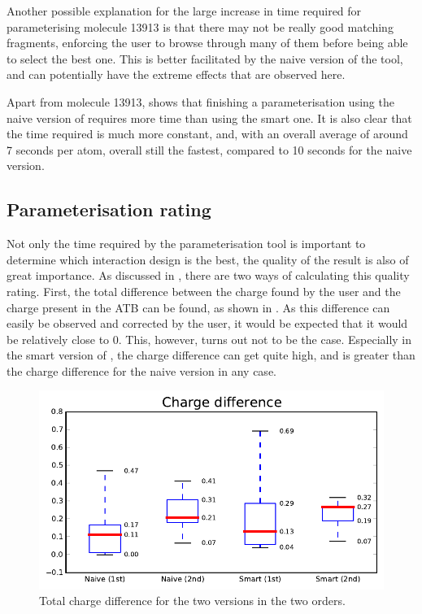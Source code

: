 Another possible explanation for the large increase in time required for parameterising molecule 13913 is that there may not be really good matching fragments, enforcing the user to browse through many of them before being able to select the best one. This is better facilitated by the naive version of the tool, and can potentially have the extreme effects that are observed here.

Apart from molecule 13913,  shows that finishing a parameterisation using the naive version of \oframp{} requires more time than using the smart one. It is also clear that the time required is much more constant, and, with an overall average of around 7 seconds per atom, overall still the fastest, compared to 10 seconds for the naive version.


\subsection{Parameterisation rating}
Not only the time required by the parameterisation tool is important to determine which interaction design is the best, the quality of the result is also of great importance. As discussed in , there are two ways of calculating this quality rating. First, the total difference between the charge found by the user and the charge present in the ATB can be found, as shown in . As this difference can easily be observed and corrected by the user, it would be expected that it would be relatively close to 0. This, however, turns out not to be the case. Especially in the smart version of \oframp, the charge difference can get quite high, and is greater than the charge difference for the naive version in any case.

\begin{figure}[h!]
\center
\includegraphics[width=.6\textwidth]{img/graphs/1a_00.pdf}
\caption{Total charge difference for the two versions in the two orders.}
\end{figure}

